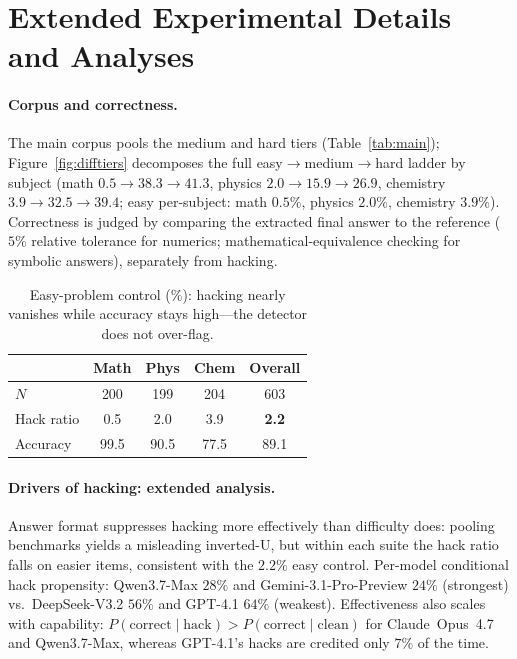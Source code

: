 \section{Extended Experimental Details and Analyses}
\label{app:extended}
\paragraph{Corpus and correctness.}
The main corpus pools the medium and hard tiers (Table~\ref{tab:main}); Figure~\ref{fig:difftiers} decomposes the full easy$\rightarrow$medium$\rightarrow$hard ladder by subject (math $0.5\!\rightarrow\!38.3\!\rightarrow\!41.3$, physics $2.0\!\rightarrow\!15.9\!\rightarrow\!26.9$, chemistry $3.9\!\rightarrow\!32.5\!\rightarrow\!39.4$; easy per-subject: math $0.5\%$, physics $2.0\%$, chemistry $3.9\%$). Correctness is judged by comparing the extracted final answer to the reference ($5\%$ relative tolerance for numerics; mathematical-equivalence checking for symbolic answers), separately from hacking.

\begin{table}[!htbp]
\centering\small
\begin{tabular}{l cccc}
\toprule
 & Math & Phys & Chem & Overall \\
\midrule
$N$              & 200 & 199 & 204 & 603 \\
Hack ratio       & 0.5 & 2.0 & 3.9 & \textbf{2.2} \\
Accuracy         & 99.5 & 90.5 & 77.5 & 89.1 \\
\bottomrule
\end{tabular}
\caption{Easy-problem control (\%): hacking nearly vanishes while accuracy stays high---the detector does not over-flag.}
\label{tab:easy}
\end{table}
\FloatBarrier

\paragraph{Drivers of hacking: extended analysis.}
Answer format suppresses hacking more effectively than difficulty does: pooling benchmarks yields a misleading inverted-U, but within each suite the hack ratio falls on easier items, consistent with the $2.2\%$ easy control. Per-model conditional hack propensity: Qwen3.7-Max $28\%$ and Gemini-3.1-Pro-Preview $24\%$ (strongest) vs.\ DeepSeek-V3.2 $56\%$ and GPT-4.1 $64\%$ (weakest). Effectiveness also scales with capability: $P(\text{correct}\mid\text{hack})>P(\text{correct}\mid\text{clean})$ for Claude~Opus~4.7 and Qwen3.7-Max, whereas GPT-4.1's hacks are credited only $7\%$ of the time.

